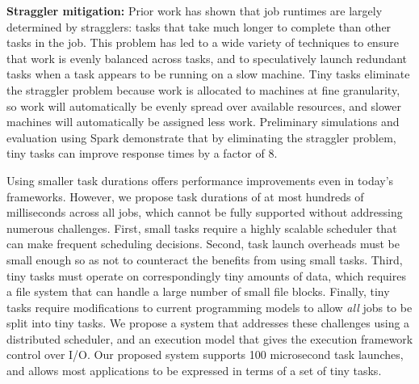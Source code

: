 \vspace{4pt}\noindent\textbf{Straggler mitigation:}
Prior work has shown that job runtimes are largely determined by
stragglers: tasks that take much longer to complete than other tasks in the
job. This problem has led to a wide variety of techniques to ensure that
work is evenly balanced across tasks, and to speculatively launch
redundant tasks when a task appears to be running on a slow machine.
Tiny tasks eliminate the straggler problem because work is allocated to
machines at fine granularity, so work will automatically be evenly spread
over available resources, and slower machines will automatically be assigned
less work. Preliminary simulations and evaluation using Spark demonstrate
that by eliminating the straggler problem, tiny tasks can improve response
times by a factor of 8.


Using smaller task durations offers performance improvements even in
today's frameworks.  However, we propose task durations of at most
hundreds of milliseconds across all jobs, which cannot be fully supported without addressing
numerous challenges. First, small tasks require a highly scalable scheduler
that can make frequent scheduling decisions. Second,
task launch overheads must be small enough so as not to counteract the
benefits from using small tasks.
Third, tiny tasks must operate on correspondingly tiny amounts
of data, which requires a file system that can handle a large number of 
small file blocks. Finally, tiny tasks require modifications to current programming
models to allow \emph{all} jobs to be split into tiny tasks. We propose a system
that addresses these challenges using a distributed scheduler, and an execution model that gives the execution framework control
over I/O. Our proposed system supports
100 microsecond task launches, and allows most applications to be
expressed in terms of a set of tiny tasks.

